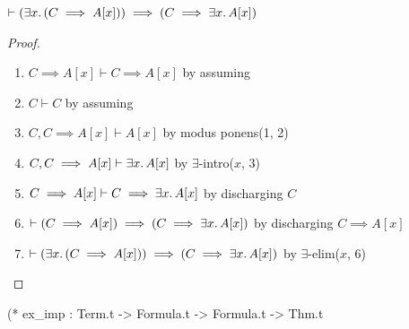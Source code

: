 \begin{node}
$\vdash(\exists x\ldotp(C\implies A[x]))\implies(C\implies\exists x\ldotp A[x])$
\end{node}

\begin{proof}
\begin{enumerate}
\item $C\implies A[x]\vdash C\implies A[x]$ by assuming
\item $C\vdash C$ by assuming
\item $C, C\implies A[x]\vdash A[x]$ by modus ponens(1, 2)%
\item $C, C\implies A[x]\vdash\exists x\ldotp A[x]$ by
  $\exists$-intro($x$, 3)%
\item $C\implies A[x]\vdash C\implies\exists x\ldotp A[x]$ by
  discharging $C$%
\item $\vdash(C\implies A[x])\implies(C\implies\exists x\ldotp A[x])$ by
  discharging $C\implies A[x]$%
\item $\vdash(\exists x\ldotp(C\implies A[x]))\implies(C\implies\exists x\ldotp A[x])$ by
  $\exists$-elim($x$, 6)\qedhere%
\end{enumerate}
\end{proof}

\nwenddocs{}\plusendmoddef\nwstartdeflinemarkup{}\nwenddeflinemarkup
(* ex_imp : Term.t -> Formula.t -> Formula.t -> Thm.t

